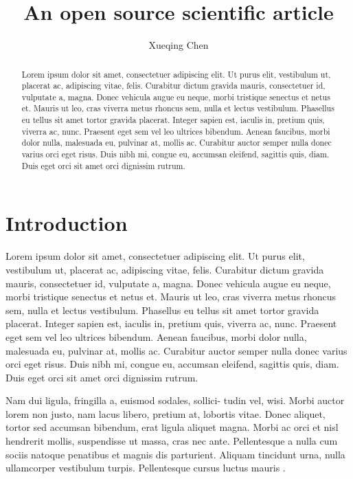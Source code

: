 \documentclass[twocolumn]{aastex631}
\begin{document}
\title{An open source scientific article}

\author{Xueqing Chen}

\begin{abstract}
    Lorem ipsum dolor sit amet, consectetuer adipiscing elit.
    Ut purus elit, vestibulum ut, placerat ac, adipiscing vitae, felis.
    Curabitur dictum gravida mauris, consectetuer id, vulputate a, magna.
    Donec vehicula augue eu neque, morbi tristique senectus et netus et.
    Mauris ut leo, cras viverra metus rhoncus sem, nulla et lectus vestibulum.
    Phasellus eu tellus sit amet tortor gravida placerat.
    Integer sapien est, iaculis in, pretium quis, viverra ac, nunc.
    Praesent eget sem vel leo ultrices bibendum.
    Aenean faucibus, morbi dolor nulla, malesuada eu, pulvinar at, mollis ac.
    Curabitur auctor semper nulla donec varius orci eget risus.
    Duis nibh mi, congue eu, accumsan eleifend, sagittis quis, diam.
    Duis eget orci sit amet orci dignissim rutrum.
\end{abstract}

\section{Introduction}
\label{sec:intro}

Lorem ipsum dolor sit amet, consectetuer adipiscing elit.
Ut purus elit, vestibulum ut, placerat ac, adipiscing vitae, felis.
Curabitur dictum gravida mauris, consectetuer id, vulputate a, magna.
Donec vehicula augue eu neque, morbi tristique senectus et netus et.
Mauris ut leo, cras viverra metus rhoncus sem, nulla et lectus vestibulum.
Phasellus eu tellus sit amet tortor gravida placerat.
Integer sapien est, iaculis in, pretium quis, viverra ac, nunc.
Praesent eget sem vel leo ultrices bibendum.
Aenean faucibus, morbi dolor nulla, malesuada eu, pulvinar at, mollis ac.
Curabitur auctor semper nulla donec varius orci eget risus.
Duis nibh mi, congue eu, accumsan eleifend, sagittis quis, diam.
Duis eget orci sit amet orci dignissim rutrum.

Nam dui ligula, fringilla a, euismod sodales, sollici- tudin vel, wisi.
Morbi auctor lorem non justo, nam lacus libero, pretium at, lobortis vitae.
Donec aliquet, tortor sed accumsan bibendum, erat ligula aliquet magna.
Morbi ac orci et nisl hendrerit mollis, suspendisse ut massa, cras nec ante.
Pellentesque a nulla cum sociis natoque penatibus et magnis dis parturient.
Aliquam tincidunt urna, nulla ullamcorper vestibulum turpis.
Pellentesque cursus luctus mauris \citep{Luger2021}.
\end{document}
